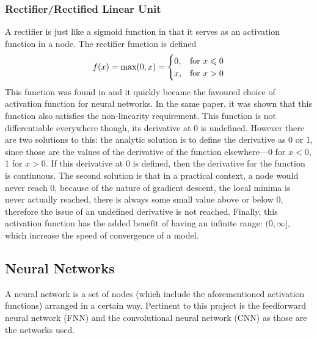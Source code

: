 \documentclass[a4paper,fleqn,usenatbib]{mnras}
\begin{document}
\subsubsection{Rectifier/Rectified Linear Unit}
A rectifier is just like a sigmoid function in that it serves as an activation function in a node. The rectifier function is defined
\begin{equation}
f(x)=\textnormal{max}(0,x)= \begin{cases} 0, & \mbox{for } x\leq0 \\ x, & \mbox{for } x>0 \end{cases}	
\end{equation}
This function was found in \cite{ReLu} and it quickly became the favoured choice of activation function for neural networks. In the same paper, it was shown that this function also satisfies the non-linearity requirement. This function is not differentiable everywhere though, its derivative at 0 is undefined. However there are two solutions to this: the analytic solution is to define the derivative as 0 or 1, since those are the values of the derivative of the function elsewhere---0 for $x<0$, 1 for $x>0$. If this derivative at 0 is defined, then the derivative for the function is continuous. The second solution is that in a practical context, a node would never reach 0, because of the nature of gradient descent, the local minima is never actually reached, there is always some small value above or below 0, therefore the issue of an undefined derivative is not reached. Finally, this activation function has the added benefit of having an infinite range: $(0,\infty]$, which increase the speed of convergence of a model.

\subsection{Neural Networks}
A neural network is a set of nodes (which include the aforementioned activation functions) arranged in a certain way. Pertinent to this project is the feedforward neural network (FNN) and the convolutional neural network (CNN) as those are the networks used.
\end{document}
